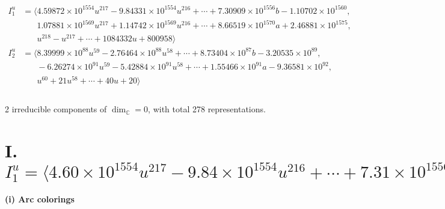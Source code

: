 \documentclass[1p]{elsarticle_modified}
\theoremstyle{definition}
\begin{document}
\begin{align*}
I^u_{1}&=\langle 
4.59872\times10^{1554} u^{217}-9.84331\times10^{1554} u^{216}+\cdots+7.30909\times10^{1556} b-1.10702\times10^{1560},\\
\phantom{I^u_{1}}&\phantom{= \langle  }1.07881\times10^{1569} u^{217}+1.14742\times10^{1569} u^{216}+\cdots+8.66519\times10^{1570} a+2.46881\times10^{1575},\\
\phantom{I^u_{1}}&\phantom{= \langle  }u^{218}- u^{217}+\cdots+1084332 u+800958\rangle \\
I^u_{2}&=\langle 
8.39999\times10^{88} u^{59}-2.76464\times10^{88} u^{58}+\cdots+8.73404\times10^{87} b-3.20535\times10^{89},\\
\phantom{I^u_{2}}&\phantom{= \langle  }-6.26274\times10^{91} u^{59}-5.42884\times10^{91} u^{58}+\cdots+1.55466\times10^{91} a-9.36581\times10^{92},\\
\phantom{I^u_{2}}&\phantom{= \langle  }u^{60}+21 u^{58}+\cdots+40 u+20\rangle \\
\\
\end{align*}
\raggedright * 2 irreducible components of $\dim_{\mathbb{C}}=0$, with total 278 representations.\\
\newpage
\renewcommand{\arraystretch}{1}
\centering \section*{I. $I^u_{1}= \langle 4.60\times10^{1554} u^{217}-9.84\times10^{1554} u^{216}+\cdots+7.31\times10^{1556} b-1.11\times10^{1560},\;1.08\times10^{1569} u^{217}+1.15\times10^{1569} u^{216}+\cdots+8.67\times10^{1570} a+2.47\times10^{1575},\;u^{218}- u^{217}+\cdots+1084332 u+800958 \rangle$}
\flushleft \textbf{(i) Arc colorings}\\
\end{document}
